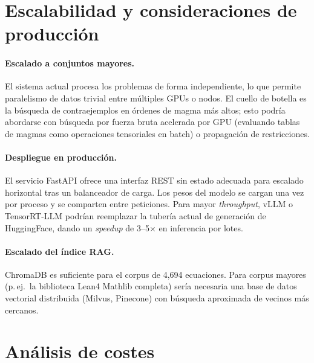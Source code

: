 \documentclass{article}
\begin{document}
\section{Escalabilidad y consideraciones de producci\'on}
\label{sec:scalability}

\paragraph{Escalado a conjuntos mayores.} El sistema actual procesa los problemas de forma independiente, lo que permite paralelismo de datos trivial entre m\'ultiples GPUs o nodos. El cuello de botella es la b\'usqueda de contraejemplos en \'ordenes de magma m\'as altos; esto podr\'ia abordarse con b\'usqueda por fuerza bruta acelerada por GPU (evaluando tablas de magmas como operaciones tensoriales en batch) o propagaci\'on de restricciones.

\paragraph{Despliegue en producci\'on.} El servicio FastAPI ofrece una interfaz REST sin estado adecuada para escalado horizontal tras un balanceador de carga. Los pesos del modelo se cargan una vez por proceso y se comparten entre peticiones. Para mayor \textit{throughput}, vLLM o TensorRT-LLM podr\'ian reemplazar la tuber\'ia actual de generaci\'on de HuggingFace, dando un \textit{speedup} de 3--5$\times$ en inferencia por lotes.

\paragraph{Escalado del \'indice RAG.} ChromaDB es suficiente para el corpus de 4{,}694 ecuaciones. Para corpus mayores (p.\,ej.\ la biblioteca Lean4 Mathlib completa) ser\'ia necesaria una base de datos vectorial distribuida (Milvus, Pinecone) con b\'usqueda aproximada de vecinos m\'as cercanos.

\section{An\'alisis de costes}
\label{sec:cost}
\end{document}
